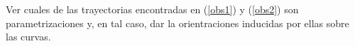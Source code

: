 \begin{tarea}
Ver cuales de las trayectorias encontradas en (\ref{obs1}) y (\ref{obs2}) son parametrizaciones y, en tal caso,  dar la orientraciones inducidas por ellas sobre las curvas.  
\end{tarea}
    
    
    
    

          





